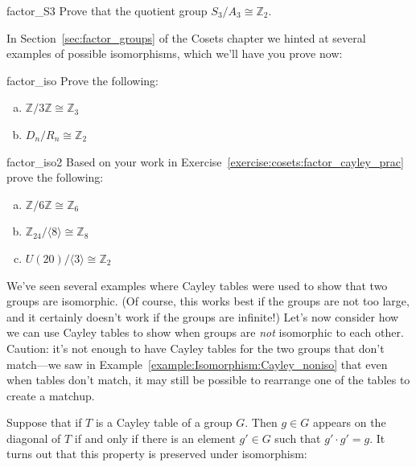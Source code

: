 
\begin{exercise}{factor_S3}
Prove that the quotient group $S_3/A_3 \cong {\mathbb Z}_2$.
\end{exercise}

In Section~\ref{sec:factor_groups} of the Cosets chapter we hinted at several examples of possible isomorphisms,  which we'll have you prove now:

\begin{exercise}{factor_iso}
Prove the following:
\begin{enumerate}[(a)]
\item
 ${\mathbb Z}/ 3 {\mathbb Z} \cong {\mathbb Z}_3$
\item
$D_n / R_n \cong {\mathbb Z}_2$
\end{enumerate}
\end{exercise}

\begin{exercise}{factor_iso2}
Based on your work in Exercise~\ref{exercise:cosets:factor_cayley_prac} prove the following:
\begin{enumerate}[(a)]
\item
 ${\mathbb Z}/ 6 {\mathbb Z} \cong {\mathbb Z}_6 $

\item
 ${\mathbb Z}_{24} / \langle 8 \rangle \cong {\mathbb Z}_8 $ 

\item
$U(20) / \langle 3 \rangle \cong  {\mathbb Z}_2 $

\end{enumerate}
\end{exercise}

We've seen several examples where  Cayley tables were used to show that two groups are isomorphic. (Of course, this works best if the groups are not too large, and it certainly doesn't work if the groups are infinite!)  Let's now consider how we can use Cayley tables to show when groups are \emph{not} isomorphic to each other. Caution: it's not enough to have Cayley tables for the two groups that don't match---we saw in Example~\ref{example:Isomorphism:Cayley_noniso} that even when tables don't match, it may still be possible to rearrange one of the tables to create a matchup.

Suppose  that if $T$ is a Cayley table of a group $G$. Then $g \in G$  appears on the diagonal of $T$ if and only if there is an element $g' \in G$ such that $g' \cdot g' = g$.  It turns out that this property is preserved under isomorphism:


